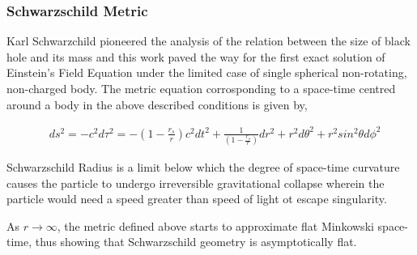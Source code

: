 \documentclass{aastex63}
\begin{document}
\subsubsection{Schwarzschild Metric} \label{subsubsec:sch}
Karl Schwarzchild pioneered the analysis of the relation between the size of black hole and its mass and this work paved the way for the first exact solution of Einstein's Field Equation under the limited case of single spherical non-rotating, non-charged body. 
The metric equation corrosponding to a space-time centred around a body in the above described conditions is given by,

\begin{align}
& ds^2 = -c^2 d\tau ^2 = - (1 - \frac{r_s}{r})c^2 dt^2  + \frac{1}{(1 - \frac{r_s}{r})}dr^2 + r^2 d\theta ^2 + r^2 sin^2 \theta d\phi ^2
\end{align}






Schwarzschild Radius is a limit below which the degree of space-time curvature causes the particle to undergo irreversible gravitational collapse wherein the particle would need a speed greater than speed of light ot escape singularity.

As $r \to \infty$, the metric defined above starts to approximate flat Minkowski space-time, thus showing that Schwarzschild geometry is asymptotically flat. 
\end{document}
